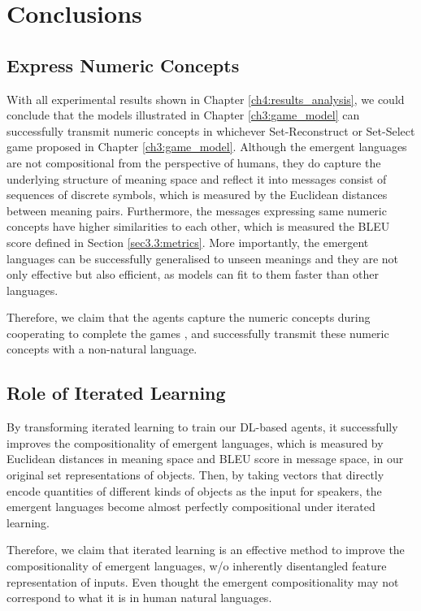 \chapter{Conclusions}
\label{ch5:conclusion}

\section{Express Numeric Concepts}
\label{sec5.1:numeric_represent}

With all experimental results shown in Chapter \ref{ch4:results_analysis}, we could conclude that the models illustrated in Chapter \ref{ch3:game_model} can successfully transmit numeric concepts in whichever Set-Reconstruct or Set-Select game proposed in Chapter \ref{ch3:game_model}. Although the emergent languages are not compositional from the perspective of humans, they do capture the underlying structure of meaning space and reflect it into messages consist of sequences of discrete symbols, which is measured by the Euclidean distances between meaning pairs. Furthermore, the messages expressing same numeric concepts have higher similarities to each other, which is measured the BLEU score defined in Section \ref{sec3.3:metrics}. More importantly, the emergent languages can be successfully generalised to unseen meanings and they are not only effective but also efficient, as models can fit to them faster than other languages.

Therefore, we claim that the agents capture the numeric concepts during cooperating to complete the games , and successfully transmit these numeric concepts with a non-natural language.

\section{Role of Iterated Learning}
\label{sec5.2:iterated_learning}

By transforming iterated learning to train our DL-based agents, it successfully improves the compositionality of emergent languages, which is measured by Euclidean distances in meaning space and BLEU score in message space, in our original set representations of objects. Then, by taking vectors that directly encode quantities of different kinds of objects as the input for speakers, the emergent languages become almost perfectly compositional under iterated learning.

Therefore, we claim that iterated learning is an effective method to improve the compositionality of emergent languages, w/o inherently disentangled feature representation of inputs. Even thought the emergent compositionality may not correspond to what it is in human natural languages.

